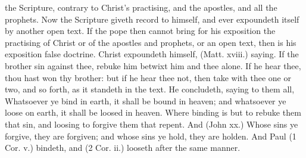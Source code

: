the Scripture, contrary to Christ's practising, and the 
apostles, and all the prophets. Now the Scripture giveth 
record to himself, and ever expoundeth itself by another 
open text. If the pope then cannot bring for his exposition 
the practising of Christ or of the apostles and prophets, or 
an open text, then is his exposition false doctrine. Christ 
expoundeth himself, (Matt. xviii.) saying. If the brother 
sin against thee, rebuke him betwixt him and thee alone. 
If he hear thee, thou hast won thy brother: but if he hear 
thee not, then take with thee one or two, and so forth, as 
it standeth in the text. He concludeth, saying to them all, 
Whatsoever ye bind in earth, it shall be bound in heaven; 
and whatsoever ye loose on earth, it shall be loosed in 
heaven. Where binding is but to rebuke them that sin, 
and loosing to forgive them that repent. And (John xx.) 
Whose sins ye forgive, they are forgiven; and whose sins 
ye hold, they are holden. And Paul (1 Cor. v.) bindeth, 
and (2 Cor. ii.) looseth after the same manner. 

